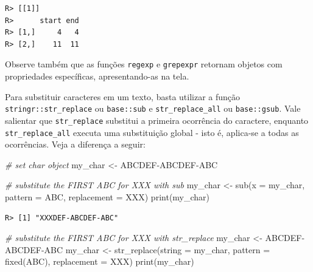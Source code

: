 \documentclass[
  11pt,
]{book}
\newenvironment{Shaded}{\begin{snugshade}}{\end{snugshade}}
\newcommand{\AttributeTok}[1]{\textcolor[rgb]{0.61,0.61,0.61}{#1}}
\newcommand{\CommentTok}[1]{\textcolor[rgb]{0.37,0.37,0.37}{\textit{#1}}}
\newcommand{\FunctionTok}[1]{\textcolor[rgb]{0,0,0}{#1}}
\newcommand{\NormalTok}[1]{#1}
\newcommand{\OtherTok}[1]{\textcolor[rgb]{0.37,0.37,0.37}{#1}}
\newcommand{\StringTok}[1]{\textcolor[rgb]{0.5,0.5,0.5}{#1}}
\begin{document}
\begin{verbatim}
R> [[1]]
R>      start end
R> [1,]     4   4
R> [2,]    11  11
\end{verbatim}

Observe também que as funções \texttt{regexp} e \texttt{grepexpr} retornam objetos com propriedades específicas, apresentando-as na tela.

Para substituir caracteres em um texto, basta utilizar a função \texttt{stringr::str\_replace} ou \texttt{base::sub} e \texttt{str\_replace\_all} ou \texttt{base::gsub}. Vale salientar que \texttt{str\_replace} substitui a primeira ocorrência do caractere, enquanto \texttt{str\_replace\_all} executa uma substituição global - isto é, aplica-se a todas as ocorrências. Veja a diferença a seguir:  

\begin{Shaded}
\begin{Highlighting}[]
\CommentTok{\# set char object}
\NormalTok{my\_char }\OtherTok{\textless{}{-}} \StringTok{\textquotesingle{}ABCDEF{-}ABCDEF{-}ABC\textquotesingle{}}

\CommentTok{\# substitute the FIRST \textquotesingle{}ABC\textquotesingle{} for \textquotesingle{}XXX\textquotesingle{} with sub}
\NormalTok{my\_char }\OtherTok{\textless{}{-}} \FunctionTok{sub}\NormalTok{(}\AttributeTok{x =}\NormalTok{ my\_char,}
               \AttributeTok{pattern =} \StringTok{\textquotesingle{}ABC\textquotesingle{}}\NormalTok{,}
               \AttributeTok{replacement =} \StringTok{\textquotesingle{}XXX\textquotesingle{}}\NormalTok{)}
\FunctionTok{print}\NormalTok{(my\_char)}
\end{Highlighting}
\end{Shaded}

\begin{verbatim}
R> [1] "XXXDEF-ABCDEF-ABC"
\end{verbatim}

\begin{Shaded}
\begin{Highlighting}[]
\CommentTok{\# substitute the FIRST \textquotesingle{}ABC\textquotesingle{} for \textquotesingle{}XXX\textquotesingle{} with str\_replace}
\NormalTok{my\_char }\OtherTok{\textless{}{-}} \StringTok{\textquotesingle{}ABCDEF{-}ABCDEF{-}ABC\textquotesingle{}}
\NormalTok{my\_char }\OtherTok{\textless{}{-}} \FunctionTok{str\_replace}\NormalTok{(}\AttributeTok{string =}\NormalTok{ my\_char,}
                       \AttributeTok{pattern =} \FunctionTok{fixed}\NormalTok{(}\StringTok{\textquotesingle{}ABC\textquotesingle{}}\NormalTok{),}
                       \AttributeTok{replacement =} \StringTok{\textquotesingle{}XXX\textquotesingle{}}\NormalTok{)}
\FunctionTok{print}\NormalTok{(my\_char)}
\end{Highlighting}
\end{Shaded}
\end{document}

